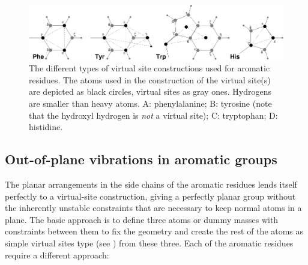 \begin{figure}
\centerline{\includegraphics[width=15cm]{plots/dumaro}}
\caption[Virtual site constructions for aromatic residues.]{The
different types of virtual site constructions used for aromatic
residues. The atoms used in the construction of the virtual site(s) are
depicted as black circles, virtual sites as gray ones. Hydrogens are
smaller than heavy atoms. {\sf A}: phenylalanine; {\sf B}: tyrosine
(note that the hydroxyl hydrogen is {\em not} a virtual site); {\sf C}:
tryptophan; {\sf D}: histidine.}
\label{fig:vistearo}
\end{figure}

\subsection{Out-of-plane vibrations in aromatic groups}
\label{sec:vsitearo}
The planar arrangements in the side chains of the aromatic residues
lends itself perfectly to a virtual-site construction, giving a
perfectly planar group without the inherently unstable constraints
that are necessary to keep normal atoms in a plane. The basic approach
is to define three atoms or dummy masses with constraints between them
to fix the geometry and create the rest of the atoms as simple virtual
sites type (see ) from these three. Each of
the aromatic residues require a different approach:

